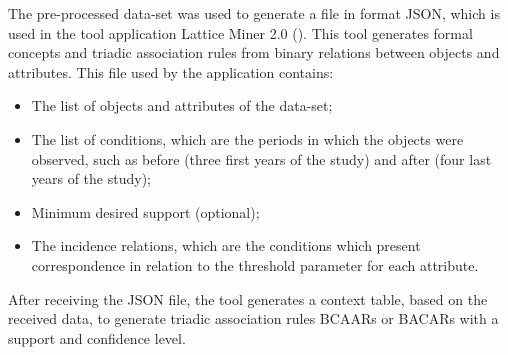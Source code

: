 \documentclass[a4paper,twoside]{article}
\begin{document}
The pre-processed data-set was used to generate a file in format JSON, which is used in the tool application Lattice Miner 2.0 (\cite{missaoui2017lattice}). This tool generates formal concepts and triadic association rules from binary relations between objects and attributes. This file used by the application contains:

\begin{itemize}
    \item The list of objects and attributes of the data-set;
    \item The list of conditions, which are the periods in which the objects were observed, such as before (three first years of the study) and after (four last years of the study);
    \item Minimum desired support (optional);
    \item The incidence relations, which are the conditions which present correspondence in relation to the threshold parameter for each attribute.
\end{itemize}

After receiving the JSON file, the tool generates a context table, based on the received data, to generate triadic association rules BCAARs or BACARs with a support and confidence level.
\end{document}
